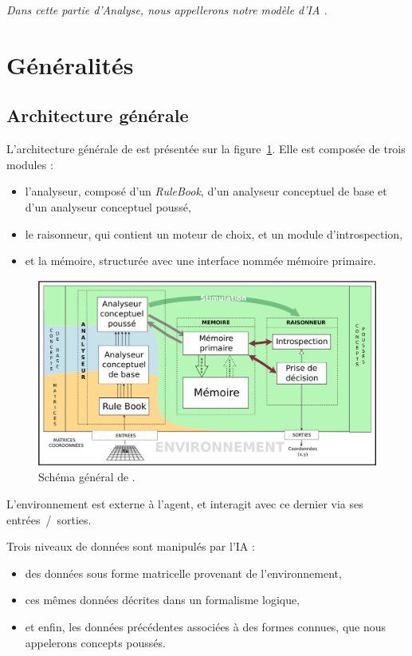 \emph{Dans cette partie d'Analyse, nous appellerons notre modèle d'IA \cogito{}.}

\section{Généralités}

\subsection{Architecture générale}
\label{subsection_architecture_generale}
L'architecture générale de \cogito{} est présentée sur la figure~\ref{schema_general}. Elle est composée de trois modules :
\begin{itemize}
\item l'analyseur, composé d'un \emph{RuleBook}, d'un analyseur conceptuel de base et d'un analyseur conceptuel poussé,
\item le raisonneur, qui contient un moteur de choix, et un module d'introspection,
\item et la mémoire, structurée avec une interface nommée mémoire primaire.
\end{itemize}

\begin{figure}[H] 
\includegraphics[width=\textwidth]{files/simplified_general_diagram} 
\caption{Schéma général de \cogito{}.} 
\label{schema_general}
\end{figure}

L'environnement est externe à l'agent, et interagit avec ce dernier via ses entrées~/~sorties.

Trois niveaux de données sont manipulés par l'IA :
\begin{itemize}
\item des données sous forme matricelle provenant de l'environnement,
\item ces mêmes données décrites dans un formalisme logique,
\item et enfin, les données précédentes associées à des formes connues, que nous appelerons concepts poussés.
\end{itemize}

